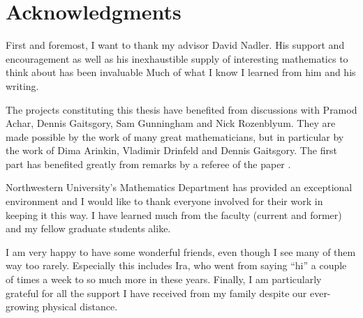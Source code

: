 \chapter*{Acknowledgments}

First and foremost, I want to thank my advisor David Nadler.
His support and encouragement as well as his inexhaustible supply of interesting mathematics to think about has been invaluable
Much of what I know I learned from him and his writing.

The projects constituting this thesis have benefited from discussions with Pramod Achar, Dennis Gaitsgory, Sam Gunningham and Nick Rozenblyum.
They are made possible by the work of many great mathematicians, but in particular by the work of Dima Arinkin, Vladimir Drinfeld and Dennis Gaitsgory.
The first part has benefited greatly from remarks by a referee of the paper \cite{Koppensteiner:pre:ExactFunctorsOnPerverseCoherentSheaves}.

Northwestern University's Mathematics Department has provided an exceptional environment and I would like to thank everyone involved for their work in keeping it this way.
I have learned much from the faculty (current and former) and my fellow graduate students alike.

I am very happy to have some wonderful friends, even though I see many of them way too rarely.
Especially this includes Ira, who went from saying \enquote{hi} a couple of times a week to so much more in these years.
Finally, I am particularly grateful for all the support I have received from my family despite our ever-growing physical distance.
